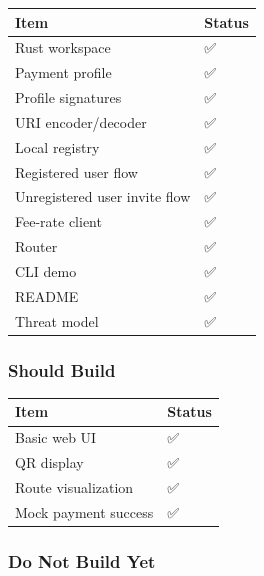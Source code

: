 \documentclass[
]{article}
\begin{document}
\begin{longtable}[]{@{}ll@{}}
\toprule\noalign{}
Item & Status \\
\midrule\noalign{}
\endhead
\bottomrule\noalign{}
\endlastfoot
Rust workspace & ✅ \\
Payment profile & ✅ \\
Profile signatures & ✅ \\
URI encoder/decoder & ✅ \\
Local registry & ✅ \\
Registered user flow & ✅ \\
Unregistered user invite flow & ✅ \\
Fee-rate client & ✅ \\
Router & ✅ \\
CLI demo & ✅ \\
README & ✅ \\
Threat model & ✅ \\
\end{longtable}

\hypertarget{should-build}{%
\subsubsection{Should Build}\label{should-build}}

\begin{longtable}[]{@{}ll@{}}
\toprule\noalign{}
Item & Status \\
\midrule\noalign{}
\endhead
\bottomrule\noalign{}
\endlastfoot
Basic web UI & ✅ \\
QR display & ✅ \\
Route visualization & ✅ \\
Mock payment success & ✅ \\
\end{longtable}

\hypertarget{do-not-build-yet}{%
\subsubsection{Do Not Build Yet}\label{do-not-build-yet}}
\end{document}
